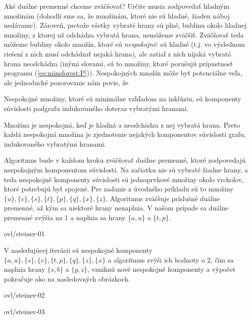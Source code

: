 \noindent
Aké duálne premenné chceme zväčšovať? Určite musia zodpovedať hladným množinám (dohodli sme sa, že množinám,
ktoré nie sú hladné, žiaden náboj nedávame). Zároveň, pretože všetky vybraté hrany sú plné, bublinu okolo
hladnej množiny, z ktorej už odchádza vybratá hrana, nemôžeme zväčšiť. Zväčšovať teda môžeme bubliny okolo
množín, ktoré sú {\em nespokojné}: sú hladné (t.j. vo výslednom riešení z nich musí odchádzať nejaká hrana), 
ale zatiaľ z nich nijaká vybratá hrana neodchádza (inými slovami, sú to množiny, ktoré porušujú prípustnosť
programu (\ref{eq:minsforest:P})).
Nespokojných množín môže byť potenciálne veľa, ale jednoduché pozorovanie nám povie, že

\begin{lema}
Nespokojné množiny, ktoré sú minimálne vzhľadom na inklúziu, sú komponenty súvislosti podgrafu indukovaného
doteraz vybratými hranami.
\end{lema}

\begin{dokaz}
Množina je nespokojná, keď je hladná a neodchádza z nej vybratá hrana. Preto každá nespokojná množina je
zjednotenie nejakých komponentov súvislosti grafu, indukovaného vybratými hranami.
\end{dokaz}

\noindent
Algoritmus bude v každom kroku zväčšovať duálne premenné, ktoré zodpovedajú
nespokojným komponentom súvislosti. Na začiatku nie sú vybraté žiadne hrany, a teda nespokojné komponenty
súvislosti sú jednoprvkové množiny okolo vrcholov, ktoré potrebujú byť spojené. Pre zadanie z úvodného príkladu
sú to množiny $\{u\},\{v\},\{s\},\{t\},\{p\},\{q\},\{x\},\{z\}$. 
Algoritmus zväčšuje príslušné duálne premenné, až kým sa niektoré
hrany nenaplnia. V našom prípade sa duálne premenné zvýšia na 1 a naplnia sa hrany $\{a,u\}$ a $\{t,p\}$.


\begin{myfig}{\textwidth}{ovl/steiner-01}
\end{myfig}


\noindent
V nasledujúcej iterácii sú nespokojné komponenty $\{a,u\},\{s\},\{v\},\{t,p\},\{q\},\{z\},\{x\}$ a 
algoritmus zvýši ich hodnoty o 2, čím sa naplnia hrany $\{s,b\}$ a $\{g,z\}$, vzniknú nové nespokojné komponenty
a výpočet pokračuje ako na nasledovných obrázkoch.


\begin{minipage}[t]{0.5\textwidth}
\vskip 0pt
\begin{myfig}{\textwidth}{ovl/steiner-02}
\end{myfig}
\end{minipage}
\begin{minipage}[t]{0.5\textwidth}
\vskip 0pt
\begin{myfig}{\textwidth}{ovl/steiner-03}
\end{myfig}
\end{minipage}



